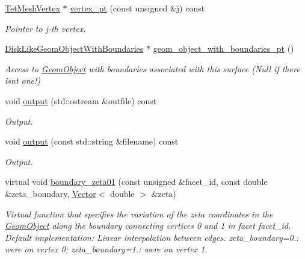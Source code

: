 \begin{DoxyCompactItemize}
\hyperlink{classoomph_1_1TetMeshVertex}{Tet\+Mesh\+Vertex} $\ast$ \hyperlink{classoomph_1_1TetMeshFacetedSurface_accfd3cbc4b919518746db4a6a64f3344}{vertex\+\_\+pt} (const unsigned \&j) const
\begin{DoxyCompactList}\small\item\em Pointer to j-\/th vertex. \end{DoxyCompactList}\item 
\hyperlink{classoomph_1_1DiskLikeGeomObjectWithBoundaries}{Disk\+Like\+Geom\+Object\+With\+Boundaries} $\ast$ \hyperlink{classoomph_1_1TetMeshFacetedSurface_aef8f755bcf97e239a5c4c987e9ab9bc2}{geom\+\_\+object\+\_\+with\+\_\+boundaries\+\_\+pt} ()
\begin{DoxyCompactList}\small\item\em Access to \hyperlink{classoomph_1_1GeomObject}{Geom\+Object} with boundaries associated with this surface (Null if there isn\textquotesingle{}t one!) \end{DoxyCompactList}\item 
void \hyperlink{classoomph_1_1TetMeshFacetedSurface_ad8d350cfdd9f7c4dde06749a5387b13e}{output} (std\+::ostream \&outfile) const
\begin{DoxyCompactList}\small\item\em Output. \end{DoxyCompactList}\item 
void \hyperlink{classoomph_1_1TetMeshFacetedSurface_ac10b05cafa5f6b6cee9cd47b3be9e033}{output} (const std\+::string \&filename) const
\begin{DoxyCompactList}\small\item\em Output. \end{DoxyCompactList}\item 
virtual void \hyperlink{classoomph_1_1TetMeshFacetedSurface_a5882667d66ad8460782b9fa36f39f485}{boundary\+\_\+zeta01} (const unsigned \&facet\+\_\+id, const double \&zeta\+\_\+boundary, \hyperlink{classoomph_1_1Vector}{Vector}$<$ double $>$ \&zeta)
\begin{DoxyCompactList}\small\item\em Virtual function that specifies the variation of the zeta coordinates in the \hyperlink{classoomph_1_1GeomObject}{Geom\+Object} along the boundary connecting vertices 0 and 1 in facet facet\+\_\+id. Default implementation\+: Linear interpolation between edges. zeta\+\_\+boundary=0.\+: we\textquotesingle{}re on vertex 0; zeta\+\_\+boundary=1.\+: we\textquotesingle{}re on vertex 1. \end{DoxyCompactList}\item 

\end{DoxyCompactItemize}
